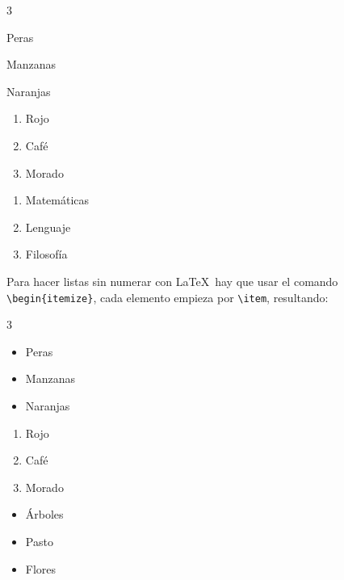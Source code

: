 	\begin{multicols}{3}
		\begin{enumeratebf}[label=\alph*) ] %
			\item Peras
			\item Manzanas
			\item Naranjas
		\end{enumeratebf}

		\begin{enumerate}[label=\roman*) ]
			\item Rojo
			\item Café
			\item Morado
		\end{enumerate}
		
		\begin{enumerate}[label=\greek*) ]
			\item Matemáticas
			\item Lenguaje
			\item Filosofía
		\end{enumerate}
	\end{multicols}

	Para hacer listas sin numerar con \LaTeX\ hay que usar el comando \texttt{\textbackslash begin\{itemize\}}, cada elemento empieza por \texttt{\textbackslash item}, resultando:

	\begin{multicols}{3}
		\begin{itemize}[label={--}]
			\item Peras
			\item Manzanas
			\item Naranjas
		\end{itemize}

		\begin{enumerate}[label={*}]
			\item Rojo
			\item Café
			\item Morado
		\end{enumerate}

		\begin{itemize}
			\item Árboles
			\item Pasto
			\item Flores
		\end{itemize}
	\end{multicols}


